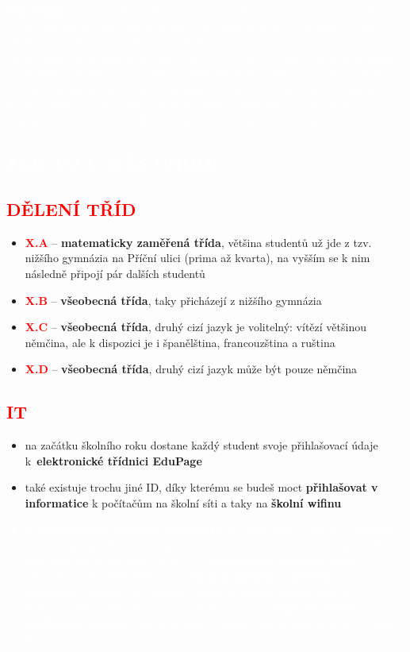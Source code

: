 \documentclass[a5paper, twoside]{article}
\newcommand{\nadpis}[4]{
  \vspace*{-50pt}
  \begin{tcolorbox}[colback = #2, boxrule = 0pt, grow to left by = #4,  grow to right by = #4, arc=8pt, height = 40pt]
    \vspace*{5pt}
    \centering \section*{\textcolor{#3}{#1}}
  \end{tcolorbox}
}
\newcommand{\podnadpis}[2]{
  \subsection*{\textcolor{#2}{#1}}
}
\begin{document}
  \vfill
  \noindent\textcolor{white}{\textbf{Poznámka.} Jak sis mohl/a všimnout, na naší škole nemáme \textit{patra}, ale \textit{podlaží}. Ve zkratce: když vejdeš dveřmi z ulice, jsi v nultém patře (v přízemí -- tento přístup razí informatici), ale v 1. podlaží. \\
  Navíc, každé dveře mají svoje číslo. Třeba 4.A -- 310. To má svou určitou logiku: první číslice z trojice značí podlaží a další dvě značí polohu na daném podlaží tak, že 01 je nejvíc vzadu vlevo v pohledu od schodů a s každou další místností směrem doprava roste o jedna. Pokud nebudeš vědět, kde je jaká učebna, rozklikni si v rozvrhu v EduPage i její číslo a trefíš tam i poslepu!}
\newpage
{}

\nadpis{JAK TO U NÁS CHODÍ}{red}{white}{-3cm}
\noindent \podnadpis{DĚLENÍ TŘÍD}{red}
\begin{itemize}[leftmargin=10pt]
	\item \textcolor{red}{\textbf{X.A}} --  \textbf{matematicky zaměřená třída}, většina studentů už jde z tzv. nižšího gymnázia na Příční ulici (prima až kvarta), na vyšším se k nim následně připojí pár dalších studentů
	\item \textcolor{red}{\textbf{X.B}} -- \textbf{všeobecná třída}, taky přicházejí z nižšího gymnázia
	\item \textcolor{red}{\textbf{X.C}} -- \textbf{všeobecná třída}, druhý cizí jazyk je volitelný: vítězí většinou němčina, ale
	      k dispozici je i španělština, francouzština a ruština
	\item \textcolor{red}{\textbf{X.D}} -- \textbf{všeobecná třída}, druhý cizí jazyk může být pouze němčina
\end{itemize}
\podnadpis{IT}{red}
\begin{itemize}[leftmargin=10pt]
	\item na začátku školního roku dostane každý student svoje přihlašovací údaje k~\textbf{elektronické třídnici EduPage}
	\item také existuje trochu jiné ID, díky kterému se budeš moct \textbf{přihlašovat v informatice} k počítačům na školní síti a taky na \textbf{školní wifinu}
\end{itemize}

\begin{redbox}
  \textcolor{white}{
  \vspace{-10pt}
  \begin{itemize}[leftmargin=10pt]
    \item S \textbf{připojováním osobních notebooků} na školní wifi to bývalo v minulosti trochu složitější. Naštěstí v minulém školním roce naše zastaralá síť přošla značnými úpravami, takže už by to teď \textbf{neměl být problém}. Stačí se přihlásit na síť \textit{JAROSKA\_S} se \textbf{stejným jménem a heslem}, jako se přihlašuješ v informatice. Pokud si heslo na počítač změníš, změní se ti i heslo na wifi! V případě, že něco nebude fungovat, \textbf{zajdi za panem profesorem Blahou} (jehož kabinet si můžeš najít na plánku školy) a popros ho o pomoc.
  \end{itemize}
  \vspace{-10pt}
  }
\end{redbox}
\end{document}
